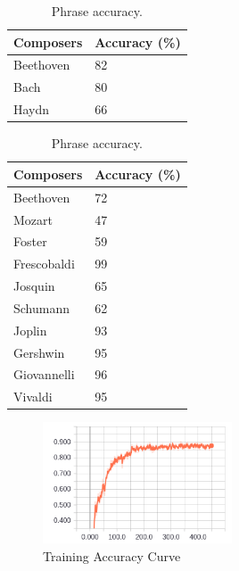 \documentclass[11pt,a4paper]{article}
\begin{document}
\begin{table}[t!]
\begin{center}
\begin{tabular}{|l|l|}
\hline \bf Composers & \bf Accuracy (\%) \\ \hline
Beethoven & 82 \\
Bach & 80\\
Haydn & 66\\
\hline
\end{tabular}
\end{center}
\caption{\label{resutls-table} Phrase accuracy. }
\end{table}



\begin{table}[t!]
\begin{center}
\begin{tabular}{|l|l|}
\hline \bf Composers & \bf Accuracy (\%)\\ \hline
Beethoven & 72 \\
Mozart & 47\\
Foster & 59\\
Frescobaldi & 99\\
Josquin & 65\\
Schumann & 62\\
Joplin & 93\\
Gershwin & 95\\
Giovannelli & 96\\
Vivaldi & 95  \\
\hline
\end{tabular}
\end{center}
\caption{\label{test-accuracy-table}Phrase accuracy. }
\end{table}


\begin{figure}[h]
\caption{Training Accuracy Curve}
\centering
\includegraphics[width=0.5\textwidth]{training_acc.png}
\end{figure}
\end{document}
